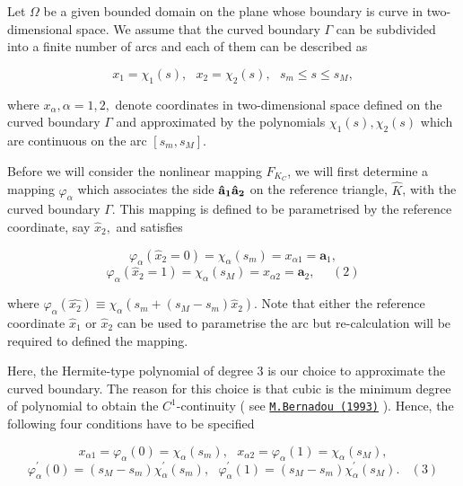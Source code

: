 Let $\Omega$ be a given bounded domain on the plane whose boundary is curve in two-\/dimensional space. We assume that the curved boundary $\Gamma$ can be subdivided into a finite number of arcs and each of them can be described as

\[ x_{1} = \chi_{1}(s), \ \ \ x_{2} = \chi_{2}(s), \ \ \ s_{m} \leq s \leq s_{M}, \]

where $ x_{\alpha}, \alpha=1,2, $ denote coordinates in two-\/dimensional space defined on the curved boundary $ \Gamma $ and approximated by the polynomials $\chi_{1}(s), \chi_{2}(s)$ which are continuous on the arc $ [s_{m},s_{M}]. $

Before we will consider the nonlinear mapping $ F_{K_{C}} $, we will first determine a mapping $ \varphi_{\alpha} $ which associates the side $ \bf{\hat{a}}_1\bf{\hat{a}}_2 $ on the reference triangle, $ \hat{K} $, with the curved boundary $\Gamma$. This mapping is defined to be parametrised by the reference coordinate, say $ \hat{x}_{2}, $ and satisfies

\[ \varphi_{\alpha}(\hat{x}_2 = 0) = \chi_{\alpha}(s_{m}) = x_{\alpha 1} = \mathbf{a}_{1}, \] \[ \varphi_{\alpha}(\hat{x}_2 = 1) = \chi_{\alpha}(s_{M}) = x_{\alpha 2} = \mathbf{a}_{2}, \ \ \ \ \ \ (2) \]

where $ \varphi_{\alpha}(\hat{x_{2}}) \equiv \chi_{\alpha}(s_{m} + (s_{M}-s_{m})\hat{x}_{2}) $. Note that either the reference coordinate $ \hat{x}_{1} $ or $ \hat{x}_{2} $ can be used to parametrise the arc but re-\/calculation will be required to defined the mapping.

Here, the Hermite-\/type polynomial of degree 3 is our choice to approximate the curved boundary. The reason for this choice is that cubic is the minimum degree of polynomial to obtain the $C^1$-\/continuity ( see \href{http://www.sciencedirect.com/science?_ob=MiamiImageURL&_cid=271868&_user=6991156&_pii=004578259390111A&_check=y&_origin=article&_zone=toolbar&_coverDate=31-Jan-1993&view=c&originContentFamily=serial&wchp=dGLzVlV-zSkzk&md5=d038a1aec18c25806e39c26187c2a200&pid=1-s2.0-004578259390111A-main.pdf}{\tt M.\+Bernadou (1993)} ). Hence, the following four conditions have to be specified

\[ x_{\alpha 1} = \varphi_{\alpha}(0) = \chi_{\alpha}(s_{m}), \mbox{ } x_{\alpha 2} = \varphi_{\alpha}(1) = \chi_{\alpha}(s_{M}), \] \[ \varphi^{\prime}_{\alpha}(0) = (s_{M}-s_{m})\chi^{\prime}_{\alpha}(s_{m}), \mbox{ } \varphi^{\prime}_{\alpha}(1) = (s_{M}-s_{m})\chi^{\prime}_{\alpha}(s_{M}). \ \ \ \ (3)\]

